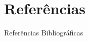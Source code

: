 \documentclass[xcolor=dvipsnames]{beamer}
\begin{document}
\section{Referências}
\begin{frame}{Referências Bibliográficas}
\renewcommand{\refname}{}

\end{frame}
\end{document}

